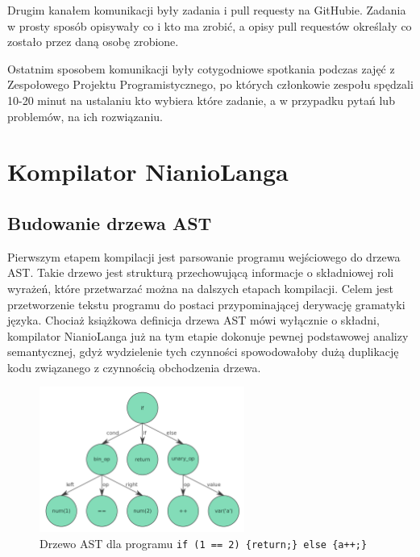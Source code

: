 \documentclass[licencjacka]{pracamgr}
\begin{document}
Drugim kanałem komunikacji były zadania i pull requesty na GitHubie. Zadania w prosty sposób
opisywały co i kto ma zrobić, a opisy pull requestów określały co zostało przez daną osobę zrobione.

Ostatnim sposobem komunikacji były cotygodniowe spotkania podczas zajęć z Zespołowego
Projektu Programistycznego, po których członkowie zespołu spędzali 10-20 minut na ustalaniu
kto wybiera które zadanie, a w przypadku pytań lub problemów, na ich rozwiązaniu.

\chapter{Kompilator NianioLanga}
\label{sec:compiler}
\section{Budowanie drzewa AST}
Pierwszym etapem kompilacji jest parsowanie programu wejściowego do drzewa AST. Takie drzewo jest strukturą przechowującą informacje o składniowej
roli wyrażeń, które przetwarzać można na dalszych etapach kompilacji. Celem jest przetworzenie tekstu programu do postaci przypominającej derywację
gramatyki języka. Chociaż książkowa definicja drzewa AST mówi wyłącznie o składni, kompilator NianioLanga już na tym etapie dokonuje pewnej
podstawowej analizy semantycznej, gdyż wydzielenie tych czynności spowodowałoby dużą duplikację kodu związanego z czynnością obchodzenia drzewa.

\begin{figure}[h]
  \centering
  \includegraphics[width=0.6\textwidth]{files/ast.png}
  \caption{Drzewo AST dla programu \texttt{if (1 == 2) \{return;\} else \{a++;\}}}
  \label{img:ast}
\end{figure}
\end{document}
